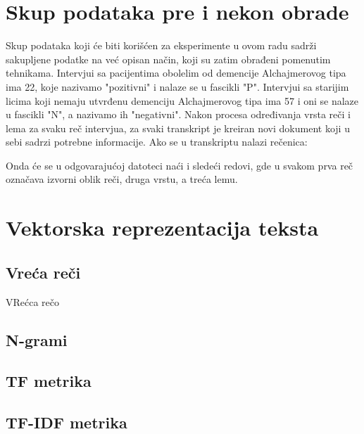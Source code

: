 \documentclass[12pt,oneside]{memoir}
\begin{document}
\section{Skup podataka pre i nekon obrade}

Skup podataka koji će biti korišćen za eksperimente u ovom radu sadrži sakupljene podatke na već opisan način,  koji su zatim obrađeni pomenutim tehnikama.  Intervjui sa pacijentima obolelim od demencije Alchajmerovog tipa ima 22,  koje nazivamo "pozitivni" i nalaze se u fascikli "P".  Intervjui sa starijim licima koji nemaju utvrđenu demenciju Alchajmerovog tipa ima 57 i oni se nalaze u fascikli "N", a nazivamo ih "negativni".  Nakon procesa određivanja vrsta reči i lema za svaku reč intervjua,  za svaki transkript je kreiran novi dokument koji u sebi sadrzi potrebne informacije.  Ako se u transkriptu nalazi rečenica:
\newline

\noindent{}
\newline\newline
Onda će se u odgovarajućoj datoteci naći i sledeći redovi, gde u svakom prva reč označava izvorni oblik reči, druga vrstu, a treća lemu. 
\newline

\noindent{}

\section{Vektorska reprezentacija teksta}
\subsection{Vreća reči}
VRećca rečo
\subsection{N-grami}
\subsection{TF metrika}
\subsection{TF-IDF metrika}
\end{document}
